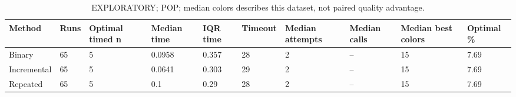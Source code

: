 \begin{table}[htbp]
\centering
\caption{EXPLORATORY; POP; median colors describes this dataset, not paired quality advantage.}
\label{tab:p2a-POP-exploratory-methods}
\begin{tabular}{llllllllll}
\hline
Method & Runs & Optimal timed n & Median time & IQR time & Timeout & Median attempts & Median calls & Median best colors & Optimal \% \\
\hline
Binary & 65 & 5 & 0.0958 & 0.357 & 28 & 2 & -- & 15 & 7.69 \\
Incremental & 65 & 5 & 0.0641 & 0.303 & 29 & 2 & -- & 15 & 7.69 \\
Repeated & 65 & 5 & 0.1 & 0.29 & 28 & 2 & -- & 15 & 7.69 \\
\hline
\end{tabular}
\end{table}
